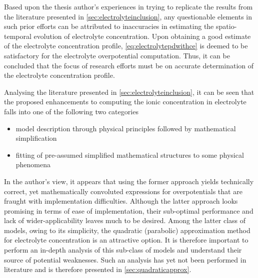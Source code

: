 
Based upon the thesis author's experiences in  trying to  replicate the  results
from the  literature presented in \cref{sec:electrolyteinclusion}, any
questionable elements in such prior efforts can be  attributed to  inaccuracies
in  estimating the  spatio-temporal evolution of  electrolyte   concentration. 
Upon   obtaining  a  good  estimate   of  the electrolyte concentration profile,
\cref{eq:electrolytepdwithce} is deemed to be satisfactory  for the  electrolyte
overpotential  computation. Thus,  it can  be concluded that the focus of
research efforts must be  on accurate determination of the electrolyte
concentration profile.

Analysing the literature presented in \cref{sec:electrolyteinclusion}, it can be
seen that the proposed enhancements to computing the  ionic concentration 
in electrolyte  falls into  one of  the following two categories
\begin{itemize}[topsep=0pt,partopsep=0pt,itemsep=0pt]
    \item model description through physical principles followed by mathematical
        simplification
    \item fitting of pre-assumed simplified mathematical structures to some
        physical phenomena
\end{itemize}

In   the  author's   view,   it   appears  that   using   the  former   approach
yields  technically  correct,  yet  mathematically  convoluted  expressions  for
overpotentials that  are fraught with implementation  difficulties. Although the
latter  approach looks  promising  in  terms of  ease  of implementation,  their
sub-optimal  performance  and lack  of  wider-applicability  leaves much  to  be
desired.  Among  the latter  class  of  models,  owing  to its  simplicity,  the
quadratic (parabolic)  approximation method for electrolyte  concentration is an
attractive option. It is therefore important  to perform an in-depth analysis of
this sub-class  of models and  understand their source of  potential weaknesses.
Such  an analysis  has  yet  not been  performed  in  literature and is
therefore presented in \cref{sec:quadraticapprox}.


